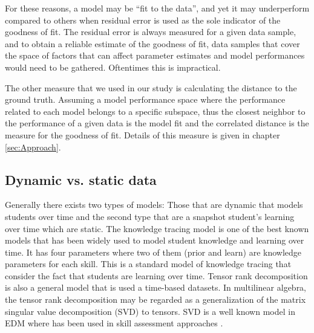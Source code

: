 For these reasons, a model may be ``fit to the data'', and yet it may underperform compared to others when residual error is used as the sole indicator of the goodness of fit.  The residual error is always measured for a given data sample, and to obtain a reliable estimate of the goodness of fit, data samples that cover the space of factors that can affect parameter estimates and model performances would need to be gathered.  Oftentimes this is impractical.

 The other measure that we used in our study is calculating the distance to the ground truth. Assuming a model performance space where the performance related to each model belongs to a specific subspace, thus the closest neighbor to the performance of a given data is the model fit and the correlated distance is the measure for the goodness of fit. Details of this measure is given in chapter \ref{sec:Approach}.





\subsection{Dynamic vs. static data}

Generally there exists two types of models: Those that are dynamic that models students over time and the second type that are a snapshot student's learning over time which are static. The knowledge tracing model \citep{corbett1994knowledge} is one of the best known models that has been widely used to model student knowledge and learning over time. It has four parameters where two of them (prior and learn) are knowledge parameters for each skill. This is a standard model of knowledge tracing that consider the fact that students are learning over time. Tensor rank decomposition is also a general model that is used a time-based datasets. In multilinear algebra, the tensor rank decomposition may be regarded as a generalization of the matrix singular value decomposition (SVD) to tensors. SVD is a well known model in EDM where has been used in skill assessment approaches \citep{Beheshti2012Numbers}.


